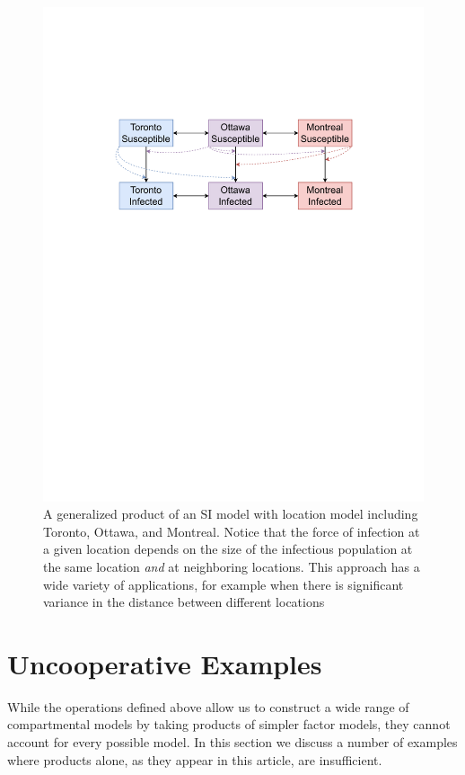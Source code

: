 \documentclass{article}
\theoremstyle{definition}
\begin{document}
\begin{figure}
    \centering
    \includegraphics[width=\textwidth]{images_pdf/Spatial_stratified_SI_General.pdf}
    \caption{A generalized product of an SI model with location model including Toronto, Ottawa, and Montreal. Notice that the force of infection at a given location depends on the size of the infectious population at the same location \textit{and} at neighboring locations. This approach has a wide variety of applications, for example when there is significant variance in the distance between different locations}
    \label{fig:spat_g}
\end{figure}

\FloatBarrier

\section{Uncooperative Examples}\label{unco}
While the operations defined above allow us to construct a wide range of compartmental models by taking products of simpler factor models, they cannot account for every possible model. In this section we discuss a number of examples where products alone, as they appear in this article, are insufficient.
\end{document}
